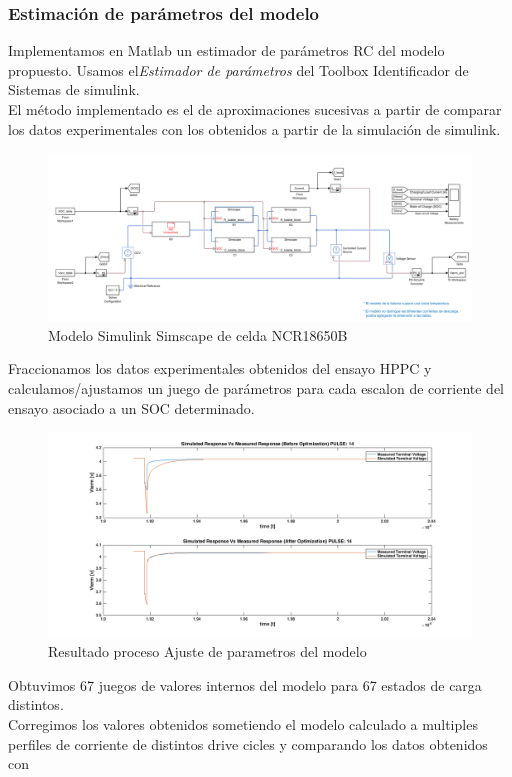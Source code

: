 \documentclass[10pt]{beamer}
\theoremstyle{remark}
\theoremstyle{definition}
\begin{document}
\begin{frame}[allowframebreaks]
	\frametitle{Estimación de parámetros del modelo}
  	Implementamos en Matlab un estimador de parámetros RC del 
  	modelo propuesto. Usamos el\emph{Estimador de parámetros} del Toolbox 
  	Identificador de Sistemas de simulink.\\
  	El método implementado es el de aproximaciones sucesivas a partir de comparar 
  	los datos experimentales con los obtenidos a partir de la simulación de 
  	simulink.
  	\begin{figure}[!hb]
		\centering
		\includegraphics[width=0.9\linewidth]{images/Modelo_celda_simulink.png}
		\caption{Modelo Simulink Simscape de celda  NCR18650B }
		\label{fig:simulink_celda}
  	\end{figure}
  	Fraccionamos los datos experimentales obtenidos del ensayo HPPC y calculamos/ajustamos
  	un juego de parámetros para cada escalon de corriente del ensayo asociado a 
  	un SOC determinado.
  	\begin{figure}[!hb]
		\centering
		\includegraphics[width=0.9\linewidth]{images/Optimizacion.png}
		\caption{Resultado proceso Ajuste de parametros del modelo}
		\label{fig:RC_Opt}
  	\end{figure}
  	\framebreak
  	Obtuvimos 67 juegos de valores internos del modelo para 67 estados de carga distintos.\\
  	Corregimos los valores obtenidos sometiendo el modelo calculado a multiples 
  	perfiles de corriente de distintos drive cicles y comparando los datos obtenidos con 

\end{frame}
\end{document}
